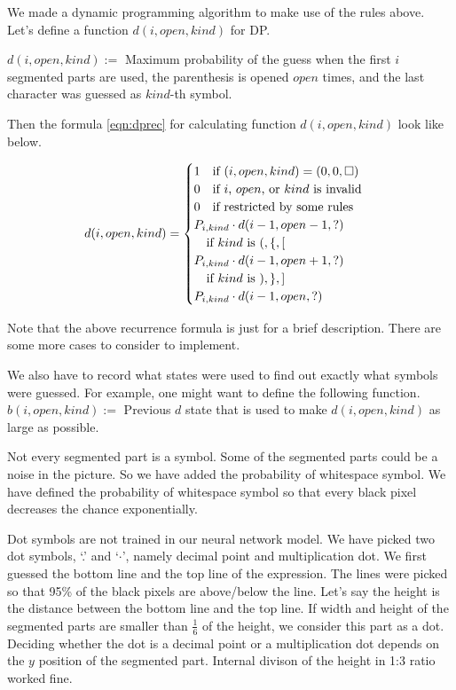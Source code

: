 \documentclass[10pt,twocolumn,letterpaper]{article}
\begin{document}
We made a dynamic programming algorithm to make use of the rules above.
Let's define a function $d(i, open, kind)$ for DP.

$d(i, open, kind) := $ Maximum probability of the guess
when the first $i$ segmented parts are used, the parenthesis is opened $open$ times, and
the last character was guessed as $kind$-th symbol.

Then the formula \ref{eqn:dprec} for calculating function $d(i, open, kind)$ look like below.

\begin{equation}
\label{eqn:dprec}
d(i, open, kind) =
\begin{cases}
1 \text{\quad if $(i,open,kind) = (0,0,\Box)$ } \\
0 \text{\quad if $i$, $open$, or $kind$ is invalid} \\
0 \text{\quad if restricted by some rules} \\
P_{i,kind} \cdot d(i-1, open-1, ?) \\
\text{\quad if $kind$ is $(, \{, [$ } \\
P_{i,kind} \cdot d(i-1, open+1, ?) \\
\text{\quad if $kind$ is $), \}, ]$ } \\
P_{i,kind} \cdot d(i-1, open, ?) \\
\end{cases}
\end{equation}

Note that the above recurrence formula is just for a brief description.
There are some more cases to consider to implement.

We also have to record what states were used to find out exactly what symbols were guessed.
For example, one might want to define the following function.
$b(i, open, kind) := $ Previous $d$ state that is used to make $d(i, open, kind)$
as large as possible.

Not every segmented part is a symbol. Some of the segmented parts could be a noise in the picture.
So we have added the probability of whitespace symbol.
We have defined the probability of whitespace symbol so that every black pixel decreases the chance exponentially.

Dot symbols are not trained in our neural network model.
We have picked two dot symbols, `.' and `$\cdot$',
namely decimal point and multiplication dot.
We first guessed the bottom line and the top line of the expression.
The lines were picked so that 95\% of the black pixels are above/below the line.
Let's say the height is the distance between the bottom line and the top line.
If width and height of the segmented parts are smaller than $\frac{1}{6}$ of the height,
we consider this part as a dot.
Deciding whether the dot is a decimal point or a multiplication dot depends on the $y$ position of the segmented part.
Internal divison of the height in 1:3 ratio worked fine.
\end{document}
